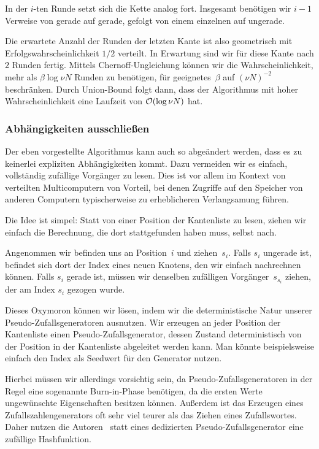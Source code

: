 In der $i$-ten Runde setzt sich die Kette analog fort.
Insgesamt benötigen wir $i-1$ Verweise von gerade auf gerade, gefolgt von einem einzelnen auf ungerade.

Die erwartete Anzahl der Runden der letzten Kante ist also geometrisch mit Erfolgswahrscheinlichkeit $1/2$ verteilt.
In Erwartung sind wir für diese Kante nach $2$ Runden fertig.
Mittels Chernoff-Ungleichung können wir die Wahrscheinlichkeit, mehr als $\beta \log \nu N$ Runden zu benötigen, für geeignetes~$\beta$ auf $(\nu N)^{-2}$ beschränken.
Durch Union-Bound folgt dann, dass der Algorithmus mit hoher Wahrscheinlichkeit eine Laufzeit von $\mathcal{O}\!\left(\log \nu N\right)$ hat.

\subsubsection{Abhängigkeiten ausschließen}
Der eben vorgestellte Algorithmus kann auch so abgeändert werden, dass es zu keinerlei expliziten Abhängigkeiten kommt.
Dazu vermeiden wir es einfach, vollständig zufällige Vorgänger zu lesen.
Dies ist vor allem im Kontext von verteilten Multicomputern von Vorteil, bei denen Zugriffe auf den Speicher von anderen Computern typischerweise zu erheblicheren Verlangsamung führen.

Die Idee ist simpel: Statt von einer Position der Kantenliste zu lesen, ziehen wir einfach die Berechnung, die dort stattgefunden haben muss, selbst nach.

Angenommen wir befinden uns an Position~$i$ und ziehen~$s_i$.
Falls $s_i$ ungerade ist, befindet sich dort der Index eines neuen Knotens, den wir einfach nachrechnen können.
Falls $s_i$ gerade ist, müssen wir  denselben zufälligen Vorgänger~$s_{s_i}$ ziehen, der am Index $s_i$ gezogen wurde.

Dieses Oxymoron können wir lösen, indem wir die deterministische Natur unserer Pseudo-Zufallsgeneratoren ausnutzen.
Wir erzeugen an jeder Position der Kantenliste einen Pseudo-Zufallsgenerator, dessen Zustand deterministisch von der Position in der Kantenliste abgeleitet werden kann.
Man könnte beispielsweise einfach den Index als Seedwert für den Generator nutzen.

Hierbei müssen wir allerdings vorsichtig sein, da Pseudo-Zufallsgeneratoren in der Regel eine sogenannte Burn-in-Phase benötigen, da die ersten Werte ungewünschte Eigenschaften besitzen können.
Außerdem ist das Erzeugen eines Zufallszahlengenerators oft sehr viel teurer als das Ziehen eines Zufallswortes.
Daher nutzen die Autoren~\cite{SANDERS2016489} statt eines dedizierten Pseudo-Zufallsgenerator eine zufällige Hashfunktion.

